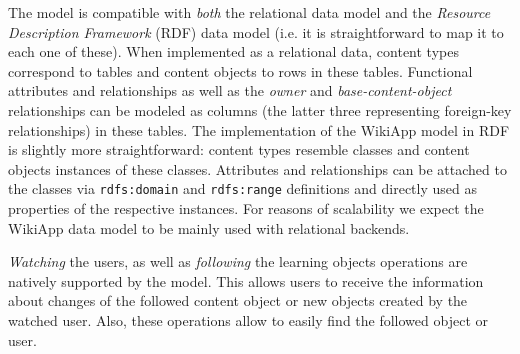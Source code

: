 \documentclass[ngerman,UKenglish,table]{scrbook}
\begin{document}
The model is compatible with \emph{both} the relational data model and the \emph{Resource Description Framework} (RDF) data model (i.e. it is straightforward to map it to each one of these).
When implemented as a relational data, content types correspond to tables and content objects to rows in these tables.
Functional attributes and relationships as well as the \textit{owner} and \textit{base-content-object} relationships can be modeled as columns (the latter three representing foreign-key relationships) in these tables.
The implementation of the WikiApp model in RDF is slightly more straightforward: content types resemble classes and content objects instances of these classes.
Attributes and relationships can be attached to the classes via \verb|rdfs:domain| and \verb|rdfs:range| definitions and directly used as properties of the respective instances.
For reasons of scalability we expect the WikiApp data model to be mainly used with relational backends.

\textit{Watching} the users, as well as \textit{following} the learning objects operations are natively supported by the model.
This allows users to receive the information about changes of the followed content object or new objects created by the watched user.
Also, these operations allow to easily find the followed object or user.
\end{document}
